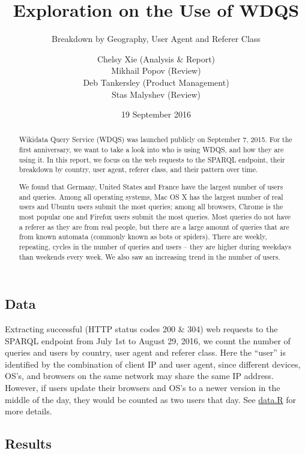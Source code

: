 \documentclass[12pt,]{article}
\title{Exploration on the Use of WDQS}
\subtitle{Breakdown by Geography, User Agent and Referer Class}
\author{Chelsy Xie (Analysis \& Report) \\ Mikhail Popov (Review) \\ Deb Tankersley (Product Management) \\ Stas Malyshev (Review)}
\date{19 September 2016}
\begin{document}
\maketitle

\renewcommand{\abstractname}{Executive Summary}

\begin{abstract}
Wikidata Query Service (WDQS) was launched publicly on September 7, 2015. For the first anniversary, we want to take a look into who is using WDQS, and how they are using it. In this report, we focus on the web requests to the SPARQL endpoint, their breakdown by country, user agent, referer class, and their pattern over time. 

We found that Germany, United States and France have the largest number of users and queries. Among all operating systems, Mac OS X has the largest number of real users and Ubuntu users submit the most queries; among all browsers, Chrome is the most popular one and Firefox users submit the most queries. Most queries do not have a referer as they are from real people, but there are a large amount of queries that are from known automata (commonly known as bots or spiders). There are weekly, repeating, cycles in the number of queries and users -- they are higher during weekdays than weekends every week. We also saw an increasing trend in the number of users.
\end{abstract}

\subsection{Data}\label{data}

Extracting successful (HTTP status codes 200 \& 304) web requests to the
SPARQL endpoint from July 1st to August 29, 2016, we count the number of
queries and users by country, user agent and referer class. Here the
``user'' is identified by the combination of client IP and user agent,
since different devices, OS's, and browsers on the same network may
share the same IP address. However, if users update their browsers and
OS's to a newer version in the middle of the day, they would be counted
as two users that day. See
\href{https://github.com/wikimedia-research/Discovery-WDQS-Usage-Explore/blob/master/data.R}{data.R}
for more details.

\newpage

\subsection{Results}\label{results}
\end{document}
